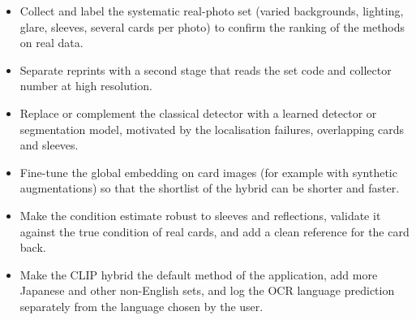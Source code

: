 \begin{itemize}
  \item Collect and label the systematic real-photo set (varied backgrounds, lighting, glare, sleeves, several cards per photo) to confirm the ranking of the methods on real data.
  \item Separate reprints with a second stage that reads the set code and collector number at high resolution.
  \item Replace or complement the classical detector with a learned detector or segmentation model, motivated by the localisation failures, overlapping cards and sleeves.
  \item Fine-tune the global embedding on card images (for example with synthetic augmentations) so that the shortlist of the hybrid can be shorter and faster.
  \item Make the condition estimate robust to sleeves and reflections, validate it against the true condition of real cards, and add a clean reference for the card back.
  \item Make the CLIP hybrid the default method of the application, add more Japanese and other non-English sets, and log the OCR language prediction separately from the language chosen by the user.
\end{itemize}
